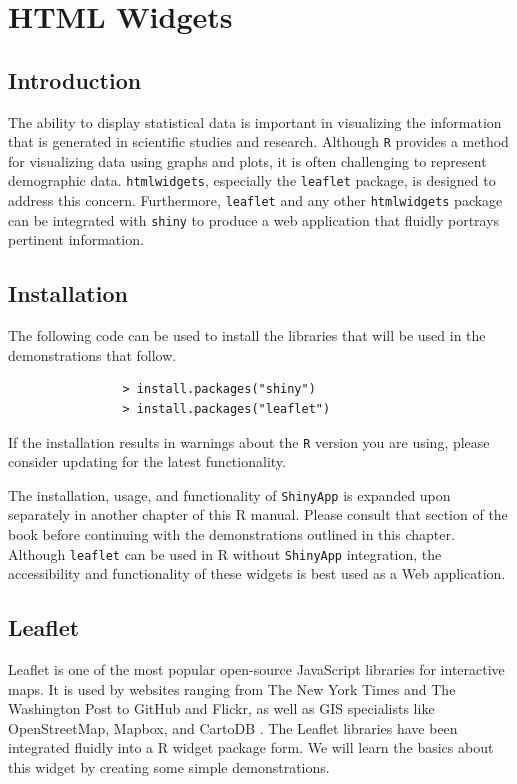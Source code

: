 	\chapter{HTML Widgets}
        \section{Introduction}
	
	The ability to display statistical data is important in visualizing the information that is generated in scientific studies and research.
        Although \texttt{R} provides a method for visualizing data using graphs and plots, it is often challenging to represent demographic data.
        \texttt{htmlwidgets}, especially the \texttt{leaflet} package, is designed to address this concern.
        Furthermore, \texttt{leaflet} and any other \texttt{htmlwidgets} package can be integrated with \texttt{shiny} to produce a web application that fluidly portrays pertinent information.
	
	\section{Installation}
	
	The following code can be used to install the libraries that will be used in the demonstrations that follow.
	
        \begin{lstlisting}
                > install.packages("shiny")
                > install.packages("leaflet")
        \end{lstlisting}
	
	If the installation results in warnings about the \texttt{R} version you are using, please consider updating for the latest functionality.
	
	The installation, usage, and functionality of \texttt{ShinyApp} is expanded upon separately in another chapter of this R manual. Please consult that section of the book before continuing with the demonstrations outlined in this chapter. Although \texttt{leaflet} can be used in R without \texttt{ShinyApp} integration, the accessibility and functionality of these widgets is best used as a Web application.
	
	\section{Leaflet}
	
	Leaflet is one of the most popular open-source JavaScript libraries for interactive maps.
        It is used by websites ranging from The New York Times and The Washington Post to GitHub and Flickr, as well as GIS specialists like OpenStreetMap, Mapbox, and CartoDB \cite{leaflet}.
        The Leaflet libraries have been integrated fluidly into a R widget package form. We will learn the basics about this widget by creating some simple demonstrations.
	
